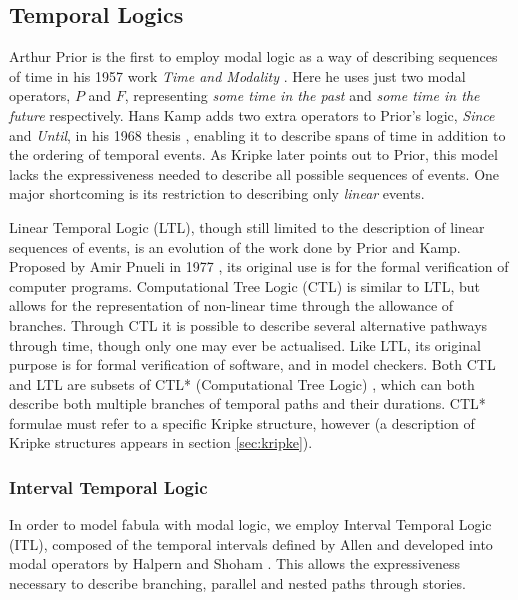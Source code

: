 \documentclass{llncs}
\def\mnote#1{\todo[color=Goldenrod,size=\scriptsize]{Matt: #1}}
\begin{document}
\mnote{Why use modal logic for possible worlds?}

\subsection{Temporal Logics}
Arthur Prior is the first to employ modal logic as a way of describing sequences of time in his 1957 work \emph{Time and Modality} \cite{prior2003time}. Here he uses just two modal operators, $P$ and $F$, representing \emph{some time in the past} and \emph{some time in the future} respectively.
Hans Kamp adds two extra operators to Prior's logic, \emph{Since} and \emph{Until}, in his 1968 thesis \cite{kamp1968tense}, enabling it to describe spans of time in addition to the ordering of temporal events.
As Kripke later points out to Prior, this model lacks the expressiveness needed to describe all possible sequences of events. One major shortcoming is its restriction to describing only \emph{linear} events. 

Linear Temporal Logic (LTL), though still limited to the description of linear sequences of events, is an evolution of the work done by Prior and Kamp. Proposed by Amir Pnueli in 1977 \cite{pnueli1977temporal}, its original use is for the formal verification of computer programs.
Computational Tree Logic (CTL) \cite{ben1983temporal} is similar to LTL, but allows for the representation of non-linear time through the allowance of branches. Through CTL it is possible to describe several alternative pathways through time, though only one may ever be actualised. Like LTL, its original purpose is for formal verification of software, and in model checkers.
Both CTL and LTL are subsets of CTL* (Computational Tree Logic) \cite{emerson1986sometimes}, which can both describe both multiple branches of temporal paths and their durations. CTL* formulae must refer to a specific Kripke structure, however (a description of Kripke structures appears in section \ref{sec:kripke}).

\subsubsection{Interval Temporal Logic}
In order to model fabula with modal logic, we employ Interval Temporal Logic (ITL), composed of the temporal intervals defined by Allen \cite{allen1983maintaining} and developed into modal operators by Halpern and Shoham \cite{halpern1991propositional}. This allows the expressiveness necessary to describe branching, parallel and nested paths through stories.
\end{document}

